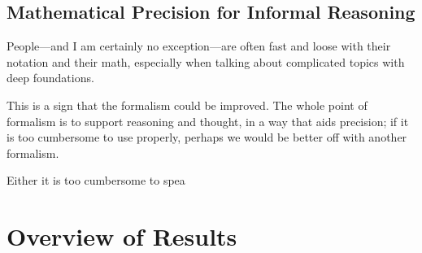 \subsection{Mathematical Precision for Informal Reasoning}
People---and I am certainly no exception---are often fast and loose with their notation and their math, especially when talking about complicated topics with deep foundations. 

    
This is a sign that the formalism could be improved.
The whole point of formalism is to support reasoning and thought, 
    in a way that aids precision; if it is too cumbersome to use properly,
    perhaps we would be better off with another formalism.
    
Either it is too cumbersome to spea


\section{Overview of Results}
